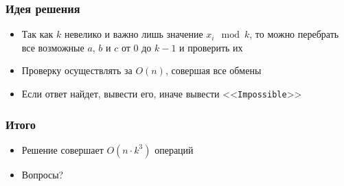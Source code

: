 \begin{frame}
  \frametitle{Идея решения}
  \begin{itemize}
    \item Так как $k$ невелико и важно лишь значение $x_i \mod k$,
    		то можно перебрать все возможные $a$, $b$ и $c$ от $0$ до $k - 1$ и проверить их  
    \item Проверку осуществлять за $O(n)$, совершая все обмены
    \item Если ответ найдет, вывести его, иначе вывести <<\texttt{Impossible}>>
  \end{itemize}
\end{frame}

\begin{frame}
  \frametitle{Итого}
  \begin{itemize}
    \item Решение совершает $O(n \cdot k^3)$ операций 
    \item Вопросы?
  \end{itemize}
\end{frame}